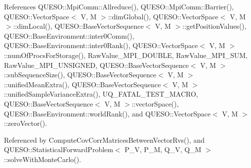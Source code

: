 References Q\-U\-E\-S\-O\-::\-Mpi\-Comm\-::\-Allreduce(), Q\-U\-E\-S\-O\-::\-Mpi\-Comm\-::\-Barrier(), Q\-U\-E\-S\-O\-::\-Vector\-Space$<$ V, M $>$\-::dim\-Global(), Q\-U\-E\-S\-O\-::\-Vector\-Space$<$ V, M $>$\-::dim\-Local(), Q\-U\-E\-S\-O\-::\-Base\-Vector\-Sequence$<$ V, M $>$\-::get\-Position\-Values(), Q\-U\-E\-S\-O\-::\-Base\-Environment\-::inter0\-Comm(), Q\-U\-E\-S\-O\-::\-Base\-Environment\-::inter0\-Rank(), Q\-U\-E\-S\-O\-::\-Vector\-Space$<$ V, M $>$\-::num\-Of\-Procs\-For\-Storage(), Raw\-Value\-\_\-\-M\-P\-I\-\_\-\-D\-O\-U\-B\-L\-E, Raw\-Value\-\_\-\-M\-P\-I\-\_\-\-S\-U\-M, Raw\-Value\-\_\-\-M\-P\-I\-\_\-\-U\-N\-S\-I\-G\-N\-E\-D, Q\-U\-E\-S\-O\-::\-Base\-Vector\-Sequence$<$ V, M $>$\-::sub\-Sequence\-Size(), Q\-U\-E\-S\-O\-::\-Base\-Vector\-Sequence$<$ V, M $>$\-::unified\-Mean\-Extra(), Q\-U\-E\-S\-O\-::\-Base\-Vector\-Sequence$<$ V, M $>$\-::unified\-Sample\-Variance\-Extra(), U\-Q\-\_\-\-F\-A\-T\-A\-L\-\_\-\-T\-E\-S\-T\-\_\-\-M\-A\-C\-R\-O, Q\-U\-E\-S\-O\-::\-Base\-Vector\-Sequence$<$ V, M $>$\-::vector\-Space(), Q\-U\-E\-S\-O\-::\-Base\-Environment\-::world\-Rank(), and Q\-U\-E\-S\-O\-::\-Vector\-Space$<$ V, M $>$\-::zero\-Vector().



Referenced by Compute\-Cov\-Corr\-Matrices\-Between\-Vector\-Rvs(), and Q\-U\-E\-S\-O\-::\-Statistical\-Forward\-Problem$<$ P\-\_\-\-V, P\-\_\-\-M, Q\-\_\-\-V, Q\-\_\-\-M $>$\-::solve\-With\-Monte\-Carlo().


